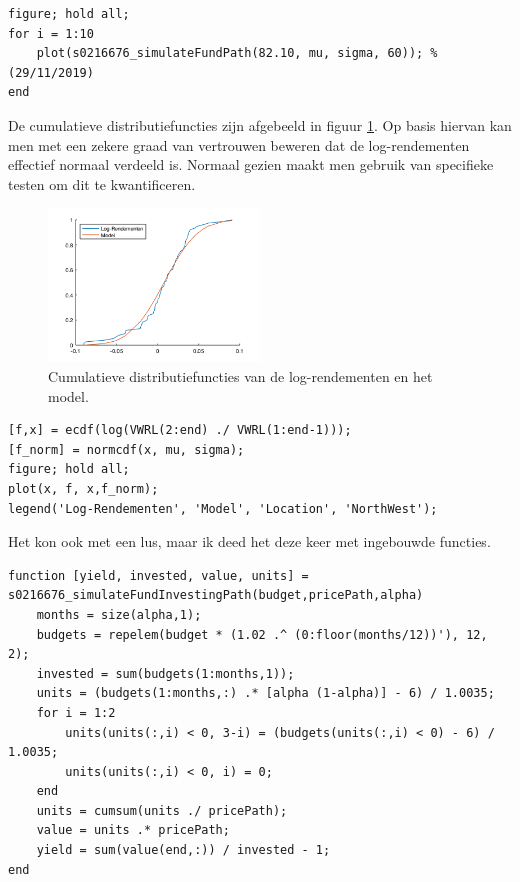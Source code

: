 \begin{lstlisting}
figure; hold all;
for i = 1:10
    plot(s0216676_simulateFundPath(82.10, mu, sigma, 60)); % (29/11/2019)
end
\end{lstlisting}



De cumulatieve distributiefuncties zijn afgebeeld in figuur \ref{fig:op7}. Op basis hiervan kan men met een zekere graad van vertrouwen beweren dat de log-rendementen effectief normaal verdeeld is. Normaal gezien maakt men gebruik van specifieke testen om dit te kwantificeren.

\begin{figure}[h]
\centering
\includegraphics[width=0.5\textwidth]{res/op7.png}
\caption{Cumulatieve distributiefuncties van de log-rendementen en het model.}
\label{fig:op7}
\end{figure}

\begin{lstlisting}
[f,x] = ecdf(log(VWRL(2:end) ./ VWRL(1:end-1)));
[f_norm] = normcdf(x, mu, sigma);
figure; hold all;
plot(x, f, x,f_norm);
legend('Log-Rendementen', 'Model', 'Location', 'NorthWest');
\end{lstlisting}



Het kon ook met een lus, maar ik deed het deze keer met ingebouwde functies. 

\begin{lstlisting}
function [yield, invested, value, units] = s0216676_simulateFundInvestingPath(budget,pricePath,alpha)
    months = size(alpha,1);
    budgets = repelem(budget * (1.02 .^ (0:floor(months/12))'), 12, 2);
    invested = sum(budgets(1:months,1));
    units = (budgets(1:months,:) .* [alpha (1-alpha)] - 6) / 1.0035;
    for i = 1:2
        units(units(:,i) < 0, 3-i) = (budgets(units(:,i) < 0) - 6) / 1.0035;
        units(units(:,i) < 0, i) = 0;
    end
    units = cumsum(units ./ pricePath);
    value = units .* pricePath;
    yield = sum(value(end,:)) / invested - 1;
end
\end{lstlisting}

